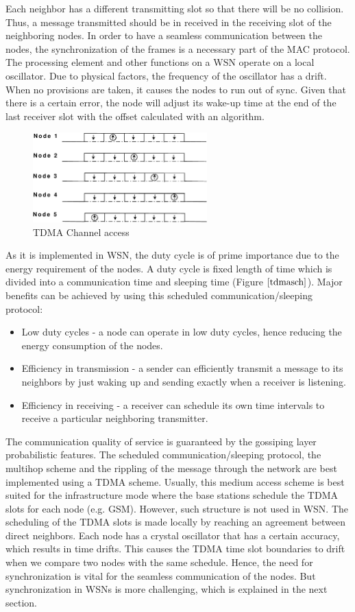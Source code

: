 \documentclass[a4paper,10pt]{report}
\begin{document}
Each neighbor has a different transmitting slot so that there will be no collision. Thus, a message transmitted should be in received in the receiving slot of the neighboring nodes. In order to have a seamless communication between the nodes, the synchronization of the frames is a necessary part of the MAC protocol. The processing element and other functions on a WSN operate on a local oscillator. Due to physical factors, the frequency of the oscillator has a drift. When no provisions are taken, it causes the nodes to run out of sync. Given that there is a certain error, the node will adjust its wake-up time at the end of the last receiver slot with the offset calculated with an algorithm. \newline
\begin{figure}
\centering
\includegraphics[width=0.6\textwidth]{tdmaschedule}
\caption{TDMA Channel access} \label{tdmasch}
\end{figure}
\newline
As it is implemented in WSN, the duty cycle is of prime importance due to the energy requirement of the nodes. A duty cycle is fixed length of time which is divided into a communication time and sleeping time (Figure $\ref{tdmasch}$). Major benefits can be achieved
by using this scheduled communication/sleeping protocol:
\begin{itemize}
\item Low duty cycles - a node can operate in low duty cycles, hence reducing the energy consumption of the nodes.
\item Efficiency in transmission - a sender can efficiently transmit a message to its neighbors by just waking up and sending exactly when a receiver is listening.
\item Efficiency in receiving - a receiver can schedule its own time intervals to receive a particular neighboring transmitter. 
\end{itemize} 
The communication quality of service is guaranteed by the gossiping layer probabilistic features. The scheduled communication/sleeping protocol, the multihop scheme and the rippling of the message through the network are best implemented using a TDMA scheme. Usually, this medium access scheme is best suited for the infrastructure mode where the base stations schedule the TDMA slots for each node (e.g. GSM). However, such structure is not used in WSN. The scheduling of the TDMA slots is made locally by reaching an agreement between direct neighbors. 
\newline 
Each node has a crystal oscillator that has a certain accuracy, which results in time drifts. This causes the TDMA time slot boundaries to drift when we compare two nodes with the same schedule. Hence, the need for synchronization is vital for the seamless communication of the nodes. But synchronization in WSNs is more challenging, which is explained in the next section.
\end{document}
